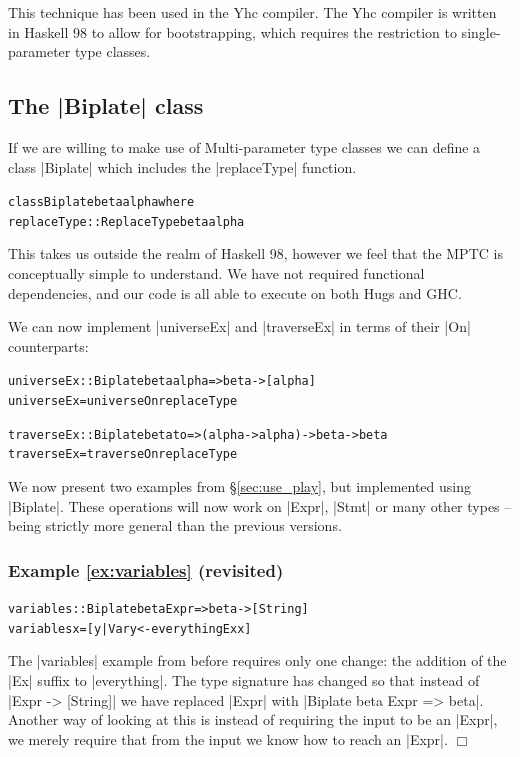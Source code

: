 \documentclass[preprint]{sigplanconf}
\newcommand{\noexample}{\hfill$\Box$}
\newenvironment{code}{\begin{alltt}\small}{\end{alltt}}
\newenvironment{revisit}[1]{\subsubsection*{Example #1 (revisited)}}{\noexample}
\begin{document}
This technique has been used in the Yhc compiler. The Yhc compiler is written in Haskell 98 to allow for bootstrapping, which requires the restriction to single-parameter type classes.

\subsection{The |Biplate| class}

If we are willing to make use of Multi-parameter type classes \cite{jones:mptc} we can define a class |Biplate| which includes the |replaceType| function.

\begin{code}
class  Biplate beta alpha where
       replaceType :: ReplaceType beta alpha
\end{code}

This takes us outside the realm of Haskell 98, however we feel that the MPTC is conceptually simple to understand. We have not required functional dependencies, and our code is all able to execute on both Hugs and GHC.

We can now implement |universeEx| and |traverseEx| in terms of their |On| counterparts:

\begin{code}
universeEx  :: Biplate beta alpha => beta -> [alpha]
universeEx  = universeOn  replaceType

traverseEx  :: Biplate beta to => (alpha -> alpha) -> beta -> beta
traverseEx  = traverseOn  replaceType
\end{code}

We now present two examples from \S\ref{sec:use_play}, but implemented using |Biplate|. These operations will now work on |Expr|, |Stmt| or many other types -- being strictly more general than the previous versions.

\begin{revisit}{\ref{ex:variables}}
\begin{code}
variables :: Biplate beta Expr => beta -> [String]
variables x = [y | Var y <- everythingEx x]
\end{code}

The |variables| example from before requires only one change: the addition of the |Ex| suffix to |everything|. The type signature has changed so that instead of |Expr -> [String]| we have replaced |Expr| with |Biplate beta Expr => beta|. Another way of looking at this is instead of requiring the input to be an |Expr|, we merely require that from the input we know how to reach an |Expr|.
\end{revisit}
\end{document}
